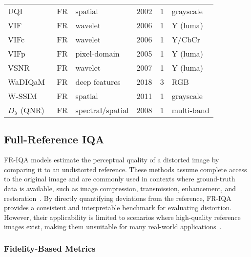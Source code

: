 \begin{longtable}{l l l c c l}
    UQI~\cite{Wang2002UQI}                 & FR   & spatial             & 2002 & 1    & grayscale \\
    VIF~\cite{Sheikh2006VIF}               & FR   & wavelet             & 2006 & 1    & Y (luma) \\
    VIFc~\cite{Sheikh2006VIF}              & FR   & wavelet             & 2006 & 1    & Y/CbCr \\
    VIFp~\cite{Sheikh2005VIFp}             & FR   & pixel-domain        & 2005 & 1    & Y (luma) \\
    VSNR~\cite{Chandler2007VSNR}           & FR   & wavelet             & 2007 & 1    & Y (luma) \\
    WaDIQaM~\cite{Bosse2018WaDIQaM}        & FR   & deep features       & 2018 & 3    & RGB \\
    W-SSIM~\cite{Engelke2011WSSIM}         & FR   & spatial             & 2011 & 1    & grayscale \\
    $D_{\lambda}$ (QNR)~\cite{Alparone2008QNR} & FR & spectral/spatial  & 2008 & 1    & multi-band \\
    
\end{longtable}

\subsection{Full-Reference IQA}\label{sec:full_reference_iqa}

FR-IQA models estimate the perceptual quality of a distorted image by comparing it to an undistorted reference. These methods assume complete access to the original image and are commonly used in contexts where ground-truth data is available, such as image compression, transmission, enhancement, and restoration~\cite{sheikh2006image, wang2004image}. By directly quantifying deviations from the reference, FR-IQA provides a consistent and interpretable benchmark for evaluating distortion. However, their applicability is limited to scenarios where high-quality reference images exist, making them unsuitable for many real-world applications~\cite{mittal2012making, hosu2020koniq}.


\subsubsection{Fidelity-Based Metrics}\label{sec:error_based_metrics}

